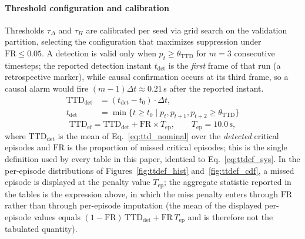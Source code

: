 \documentclass[a4paper,fleqn]{cas-dc}
\begin{document}
\paragraph{Threshold configuration and calibration}
Thresholds $\tau_\Delta$ and $\tau_H$ are calibrated per seed via grid search
on the validation partition, selecting the configuration that maximizes
suppression under $\mathrm{FR}\le0.05$. A detection is valid only when
$p_t \ge \theta_{\mathrm{TTD}}$ for $m=3$ consecutive timesteps{\color{\revcolor};
the reported detection instant $t_{\mathrm{det}}$ is the \emph{first} frame
of that run (a retrospective marker), while causal confirmation occurs at its
third frame, so a causal alarm would fire $(m{-}1)\Delta t \approx 0.21$\,s
after the reported instant}.
\begin{equation}
\begin{aligned}
\mathrm{TTD}_{\mathrm{det}} &= (t_{\mathrm{det}} - t_0)\cdot\Delta t,\\
t_{\mathrm{det}} &= \min\{t \ge t_0 \mid p_t, p_{t+1}, p_{t+2} \ge
\theta_{\mathrm{TTD}}\}
\end{aligned}
\label{eq:ttd_nominal}
\end{equation}
\begin{equation}
\mathrm{TTD}_{\mathrm{ef}} = \mathrm{TTD}_{\mathrm{det}} + \mathrm{FR}\times T_{\mathrm{ep}},
\qquad T_{\mathrm{ep}} = 10.0\,\text{s},
\label{eq:ttd_efetivo}
\end{equation}
{\color{\revcolor}where $\mathrm{TTD}_{\mathrm{det}}$ is the mean of
Eq.~\ref{eq:ttd_nominal} over the \emph{detected} critical episodes and
$\mathrm{FR}$ is the proportion of missed critical episodes; this is the
single definition used by every table in this paper, identical to
Eq.~\ref{eq:ttdef_sys}. In the per-episode distributions of
Figures~\ref{fig:ttdef_hist} and~\ref{fig:ttdef_cdf}, a missed episode is
displayed at the penalty value $T_{\mathrm{ep}}$; the aggregate statistic
reported in the tables is the expression above, in which the miss penalty
enters through $\mathrm{FR}$ rather than through per-episode imputation
(the mean of the displayed per-episode values equals
$(1-\mathrm{FR})\,\mathrm{TTD}_{\mathrm{det}} + \mathrm{FR}\,T_{\mathrm{ep}}$
and is therefore not the tabulated quantity).}
\end{document}
